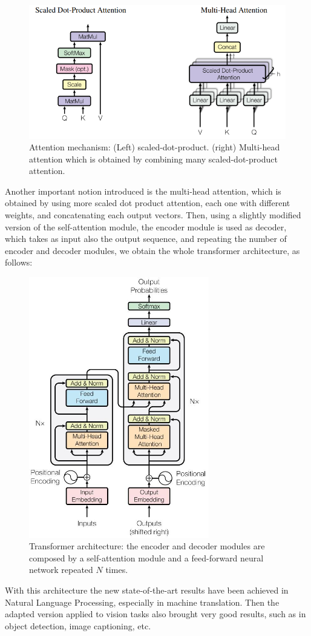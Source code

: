 \begin{figure}[H]
    \centering
    \includegraphics[width=\textwidth]{./images/2_attention}
    \caption{Attention mechanism: (Left) scaled-dot-product. (right) Multi-head attention which is obtained by combining many scaled-dot-product attention.}
    \label{fig:figure-encoder-structure}
\end{figure}

Another important notion introduced is the multi-head attention, which is obtained by using more scaled dot product attention, each one with different weights, and concatenating each output vectors.
Then, using a slightly modified version of the self-attention module, the encoder module is used as decoder, which takes as input also the output sequence, and repeating the number of encoder and decoder modules, we obtain the whole transformer architecture, as follows:

\begin{figure}[H]
    \centering
    \includegraphics[width=0.7\textwidth]{./images/2_transformer}
    \caption{Transformer architecture: the encoder and decoder modules are composed by a self-attention module and a feed-forward neural network repeated $N$ times.}
    \label{fig:figure-transformer-architecture}
\end{figure}

With this architecture the new state-of-the-art results have been achieved in Natural Language Processing, especially in machine translation.
Then the adapted version applied to vision tasks also brought very good results, such as in object detection, image captioning, etc.
